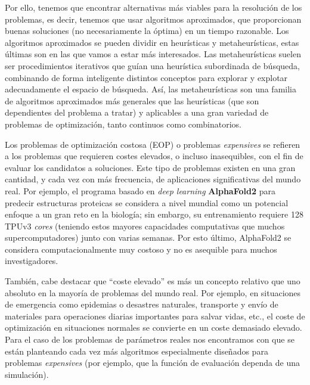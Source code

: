Por ello, tenemos que encontrar alternativas más viables para la resolución de los problemas, es decir, tenemos que usar algoritmos aproximados, que proporcionan buenas soluciones (no necesariamente la óptima) en un tiempo razonable. 
Los algoritmos aproximados se pueden dividir en heurísticas y metaheurísticas, estas últimas son en las que vamos a estar más interesados. 
Las metaheurísticas suelen ser procedimientos iterativos que guían una heurística subordinada de búsqueda, combinando de forma inteligente distintos conceptos para explorar y explotar adecuadamente el espacio de búsqueda.
Así, las metaheurísticas son una familia de algoritmos aproximados más generales que las heurísticas (que son dependientes del problema a tratar) y aplicables a una gran variedad de problemas de optimización, tanto continuos como combinatorios. 

Los problemas de optimización costosa (EOP) o problemas \textit{expensives} se refieren a los problemas que requieren costes elevados, o incluso inasequibles, con el fin de evaluar los candidatos a soluciones. 
Este tipo de problemas existen en una gran cantidad, y cada vez con más frecuencia, de aplicaciones significativas del mundo real. 
Por ejemplo, el programa basado en \textit{deep learning} \textbf{AlphaFold2} para predecir estructuras proteicas se considera a nivel mundial como un potencial enfoque a un gran reto en la biología; sin embargo, su entrenamiento requiere 128 TPUv3 \textit{cores} (teniendo estos mayores capacidades computativas que muchos supercomputadores) junto con varias semanas. 
Por esto último, AlphaFold2 se considera computacionalmente muy costoso y no es asequible para muchos investigadores.

También, cabe destacar que ``coste elevado'' es más un concepto relativo que uno absoluto en la mayoría de problemas del mundo real. 
Por ejemplo, en situaciones de emergencia como epidemias o desastres naturales, transporte y envío de materiales para operaciones diarias importantes para salvar vidas, etc., el coste de optimización en situaciones normales se convierte en un coste demasiado elevado. 
Para el caso de los problemas de parámetros reales nos encontramos con que se están planteando cada vez más algoritmos especialmente diseñados para problemas \textit{expensives} (por ejemplo, que la función de evaluación dependa de una simulación).

